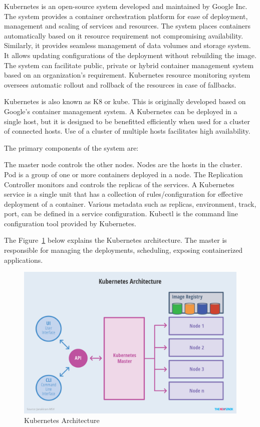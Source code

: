 Kubernetes is an open-source system developed and maintained by Google Inc.
The system provides a container orchestration platform for ease of deployment,
management and scaling of services and resources. The system places containers
automatically based on it resource requirement not compromising availability.
Similarly, it provides seamless management of data volumes and storage system.
It allows updating configurations of the deployment without rebuilding the
image. The system can facilitate public, private or hybrid container
management system based on an organization's requirement.  Kubernetes resource
monitoring system oversees automatic rollout and rollback of the resources in
case of fallbacks.


Kubernetes is also known as K8 or kube. This is originally developed based on
Google's container management system. A Kubernetes can be deployed in a single
host, but it is designed to be benefitted efficiently when used for a cluster
of connected hosts. Use of a cluster of multiple hosts facilitates high
availability.


The primary components of the system are: 

The master node controls the other nodes. Nodes are the hosts in the cluster.
Pod is a group of one or more containers deployed in a node. The Replication
Controller monitors and controls the replicas of the services. A Kubernetes
service is a single unit that has a collection of rules/configuration for
effective deployment of a container. Various metadata such as replicas,
environment, track, port, can be defined in a service configuration.  Kubectl
is the command line configuration tool provided by Kubernetes.

The Figure~\ref{fig:kube-archtecture} below explains the Kubernetes
architecture. The master is responsible for managing the deployments,
scheduling, exposing containerized applications.

\begin{figure}[htb]
	\centering\includegraphics[width=\columnwidth]{images/hid_417_Kubernetes-Architecture.png}
  \caption{Kubernetes Architecture~\cite{hid-sp18-417-kubernetes}}
  \label{fig:kube-archtecture}
\end{figure}


